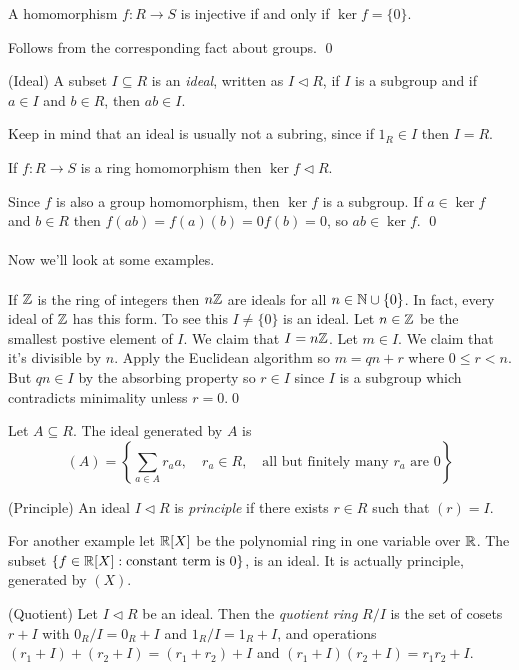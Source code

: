 \documentclass{article}
\newcommand{\nrm}{\triangleleft}
\begin{document}
\begin{itemize}
\begin{lemma}
	A homomorphism $ f:R\to S $ is injective if and only if $ \ker f = \{0\} $.
\end{lemma}
\pf Follows from the corresponding fact about groups. \qed
\begin{definition}
	(Ideal) A subset $ I\subseteq R $ is an \textit{ideal}, written as $ I\nrm R $, if $ I $ is a subgroup and if $ a\in I $ and $ b\in R $, then $ ab\in I $.
\end{definition}
Keep in mind that an ideal is usually not a subring, since if $ 1_R\in I $ then $ I=R $.
\begin{lemma}
  If $ f:R\to S $ is a ring homomorphism then $ \ker f \nrm R$.
\end{lemma} 
\pf Since $ f $ is also a group homomorphism, then $ \ker f $ is a subgroup. If $ a\in \ker f $ and $ b\in R $ then $ f(ab)=f(a)(b)=0f(b)=0 $, so $ ab\in \ker f $. \qed\\\\
Now we'll look at some examples.\\\\
If $ \mathbb{Z} $ is the ring of integers then $ n\mathbb{Z} $ are ideals for all $ n\in\mathbb{N} \cup \{0\} $. In fact, every ideal of $ \mathbb{Z} $ has this form. To see this $ I\ne \{0\} $ is an ideal. Let $ n\in \mathbb{Z} $ be the smallest postive element of $ I $. We claim that $ I=n\mathbb{Z} $. Let $ m\in I $. We claim that it's divisible by $ n $. Apply the Euclidean algorithm so $ m=qn+r $ where $ 0\le r<n $. But $ qn\in I $ by the absorbing property so $ r\in I $ since $ I $ is a subgroup which contradicts minimality unless $ r=0 $.\qed
\begin{definition}
  Let $ A\subseteq R $. The ideal generated by $ A $ is
  \[
	  (A)=\left\{\sum_{a\in A}r_aa,\quad r_a \in R, \quad \text{all but finitely many } r_a \text{ are } 0\right\}
  \]
\end{definition}
\begin{definition}
	(Principle) An ideal $ I\nrm R $ is \textit{principle} if there exists $ r\in R $ such that $ (r)=I $.
\end{definition}
For another example let $ \mathbb{R}[X] $ be the polynomial ring in one variable over $ \mathbb{R} $. The subset $ \{f\in \mathbb{R}[X]: \text{constant term is } 0\} $, is an ideal. It is actually principle, generated by $ (X) $.

\begin{definition}
	(Quotient) Let $ I\nrm R $ be an ideal. Then the \textit{quotient ring} $ R/I $ is the set of cosets $ r+I $ with $ 0_R/I=0_R+I $ and $ 1_R/I=1_R+I $, and operations $ (r_1+I)+(r_2+I)=(r_1+r_2)+I $ and $ (r_1+I)(r_2+I)=r_1r_2+I $.
\end{definition}


\end{itemize}
\end{document}
